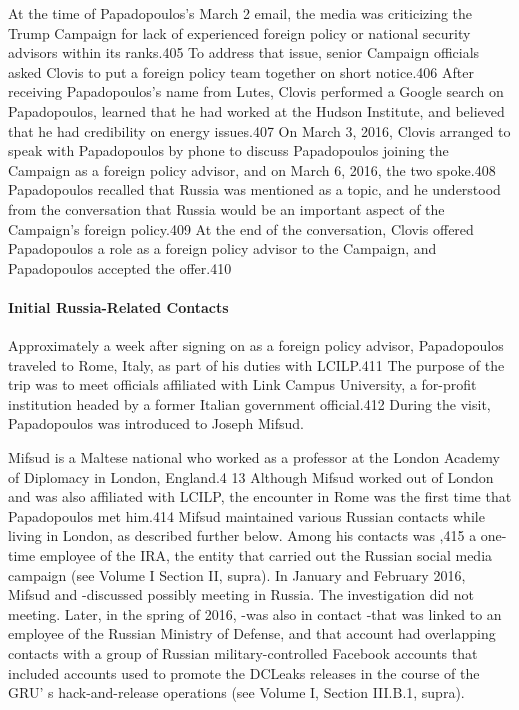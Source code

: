At the time of Papadopoulos's March 2 email,  the media was criticizing the Trump Campaign for lack of experienced foreign policy or national security advisors within its ranks.405 To address that issue, senior Campaign officials asked Clovis to put a foreign policy team together on short notice.406 After receiving Papadopoulos's name from Lutes, Clovis performed a Google search on Papadopoulos, learned that he had worked at the Hudson Institute, and believed that he had credibility on energy issues.407 On March 3, 2016,   Clovis arranged to speak with Papadopoulos by phone to discuss Papadopoulos joining the Campaign as a foreign policy advisor, and on March 6, 2016, the two spoke.408 Papadopoulos recalled that Russia was mentioned  as a topic, and he understood from the conversation that Russia would be an important aspect of the Campaign's foreign policy.409 At the end of the conversation, Clovis offered Papadopoulos a role as a foreign policy advisor to the Campaign, and Papadopoulos accepted the offer.410

\paragraph{Initial Russia-Related Contacts}

Approximately a week after signing on as a foreign policy advisor, Papadopoulos traveled to Rome, Italy, as part of his duties with LCILP.411 The purpose of the trip was to meet officials affiliated with Link Campus University, a  for-profit institution headed by a former Italian government official.412 During the visit, Papadopoulos was introduced to Joseph Mifsud.

Mifsud is a  Maltese national who worked as a  professor at the London Academy of Diplomacy in London, England.4 13 Although Mifsud worked out of London and was also affiliated with LCILP, the encounter in Rome was the first time that Papadopoulos met him.414 Mifsud maintained various Russian contacts while living in London, as described further below. Among his contacts was ,415 a one-time employee of the IRA, the entity that carried out the Russian social media campaign (see Volume I  Section II, supra). In January and February 2016,  Mifsud and -discussed possibly meeting in Russia. The investigation did not~ meeting. Later,  in the spring of 2016, -was also in contact -that was linked to an employee of the Russian Ministry of Defense, and that account had overlapping contacts with a group of Russian military-controlled Facebook accounts that included accounts used to promote the DCLeaks releases in the course of the GRU' s hack-and-release operations (see Volume I,  Section III.B.1, supra).


